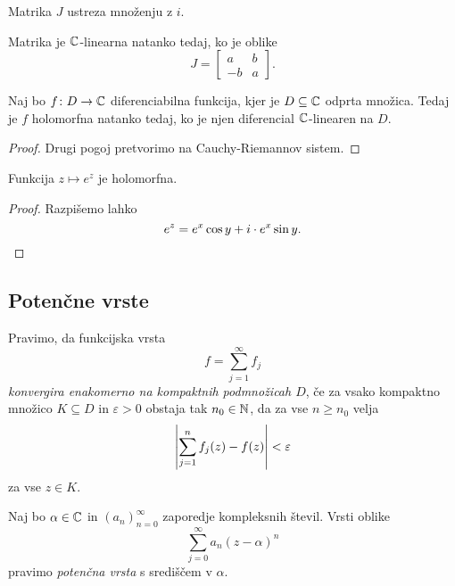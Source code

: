 \begin{opomba}
Matrika $J$ ustreza množenju z $i$.
\end{opomba}

\begin{opomba}
Matrika je $\mathbb{C}$-linearna natanko tedaj, ko je oblike
\[
J =
\begin{bmatrix}
 a & b \\
-b & a
\end{bmatrix}.
\]
\end{opomba}

\begin{trditev}
Naj bo $f \colon D \to \mathbb{C}$ diferenciabilna funkcija, kjer je
$D \subseteq \mathbb{C}$ odprta množica. Tedaj je $f$ holomorfna natanko
tedaj, ko je njen diferencial $\mathbb{C}$-linearen na $D$.
\end{trditev}

\begin{proof}
Drugi pogoj pretvorimo na Cauchy-Riemannov sistem.
\end{proof}

\begin{trditev}
Funkcija $z \mapsto e^z$ je holomorfna.
\end{trditev}

\begin{proof}
Razpišemo lahko
\[
e^z = e^x \cos y + i \cdot e^x \sin y. \qedhere
\]
\end{proof}

\newpage

\subsection{Potenčne vrste}


\begin{definicija}
Pravimo, da funkcijska vrsta
\[
f = \sum_{j=1}^\infty f_j
\]
\emph{konvergira enakomerno na kompaktnih podmnožicah $D$},
če za vsako kompaktno množico $K \subseteq D$ in $\varepsilon > 0$
obstaja tak $n_0 \in \mathbb{N}$, da za vse $n \geq n_0$ velja
\[
\left\lvert \sum_{j=1}^n f_j(z) - f(z)\right\rvert < \varepsilon
\]
za vse $z \in K$.
\end{definicija}

\begin{definicija}
Naj bo $\alpha \in \mathbb{C}$ in $(a_n)_{n=0}^\infty$ zaporedje
kompleksnih števil. Vrsti oblike
\[
\sum_{j=0}^\infty a_n (z - \alpha)^n
\]
pravimo \emph{potenčna vrsta} s središčem v
$\alpha$.
\end{definicija}

